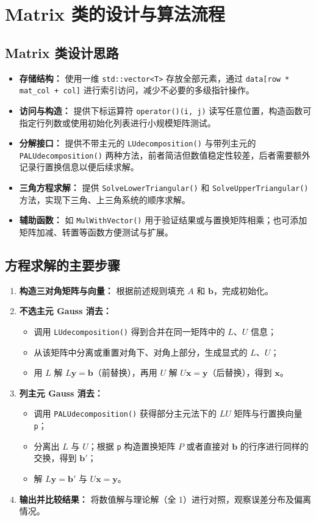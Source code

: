 \documentclass[UTF8]{ctexart}
\begin{document}
\section{Matrix 类的设计与算法流程}

\subsection{Matrix 类设计思路}
\begin{itemize}
\item \textbf{存储结构：} 使用一维 \texttt{std::vector<T>} 存放全部元素，通过 \texttt{data[row * mat\_col + col]} 进行索引访问，减少不必要的多级指针操作。
\item \textbf{访问与构造：} 提供下标运算符 \verb|operator()(i, j)| 读写任意位置，构造函数可指定行列数或使用初始化列表进行小规模矩阵测试。
\item \textbf{分解接口：} 提供不带主元的 \texttt{LUdecomposition()} 与带列主元的 \texttt{PALUdecomposition()} 两种方法，前者简洁但数值稳定性较差，后者需要额外记录行置换信息以便后续求解。
\item \textbf{三角方程求解：} 提供 \texttt{SolveLowerTriangular()} 和 \texttt{SolveUpperTriangular()} 方法，实现下三角、上三角系统的顺序求解。
\item \textbf{辅助函数：} 如 \texttt{MulWithVector()} 用于验证结果或与置换矩阵相乘；也可添加矩阵加减、转置等函数方便测试与扩展。
\end{itemize}

\subsection{方程求解的主要步骤}
\begin{enumerate}
\item \textbf{构造三对角矩阵与向量：} 根据前述规则填充 $A$ 和 $\mathbf{b}$，完成初始化。
\item \textbf{不选主元 Gauss 消去：} 
  \begin{itemize}
    \item 调用 \texttt{LUdecomposition()} 得到合并在同一矩阵中的 $L$、$U$ 信息；
    \item 从该矩阵中分离或重置对角下、对角上部分，生成显式的 $L$、$U$；
    \item 用 $L$ 解 $L\mathbf{y} = \mathbf{b}$（前替换），再用 $U$ 解 $U\mathbf{x} = \mathbf{y}$（后替换），得到 $\mathbf{x}$。
  \end{itemize}
\item \textbf{列主元 Gauss 消去：}
  \begin{itemize}
    \item 调用 \texttt{PALUdecomposition()} 获得部分主元法下的 $LU$ 矩阵与行置换向量 \texttt{p}；
    \item 分离出 $L$ 与 $U$；根据 \texttt{p} 构造置换矩阵 $P$ 或者直接对 $\mathbf{b}$ 的行序进行同样的交换，得到 $\mathbf{b}'$；
    \item 解 $L\mathbf{y} = \mathbf{b}'$ 与 $U\mathbf{x} = \mathbf{y}$。
  \end{itemize}
\item \textbf{输出并比较结果：} 将数值解与理论解（全 1）进行对照，观察误差分布及偏离情况。
\end{enumerate}
\end{document}
